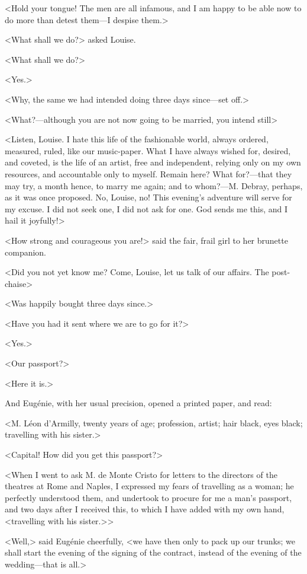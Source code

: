  <Hold your tongue! The men are all infamous, and I am happy to be able now to do more than detest them—I despise them.> 

 <What shall we do?> asked Louise. 

 <What shall we do?> 

 <Yes.> 

 <Why, the same we had intended doing three days since—set off.> 

 <What?—although you are not now going to be married, you intend still\longdash> 

 <Listen, Louise. I hate this life of the fashionable world, always ordered, measured, ruled, like our music-paper. What I have always wished for, desired, and coveted, is the life of an artist, free and independent, relying only on my own resources, and accountable only to myself. Remain here? What for?—that they may try, a month hence, to marry me again; and to whom?—M. Debray, perhaps, as it was once proposed. No, Louise, no! This evening's adventure will serve for my excuse. I did not seek one, I did not ask for one. God sends me this, and I hail it joyfully!> 

 <How strong and courageous you are!> said the fair, frail girl to her brunette companion. 

 <Did you not yet know me? Come, Louise, let us talk of our affairs. The post-chaise\longdash> 

 <Was happily bought three days since.> 

 <Have you had it sent where we are to go for it?> 

 <Yes.> 

 <Our passport?> 

 <Here it is.> 

 And Eugénie, with her usual precision, opened a printed paper, and read: 

 <M. Léon d'Armilly, twenty years of age; profession, artist; hair black, eyes black; travelling with his sister.> 

 <Capital! How did you get this passport?> 

 <When I went to ask M. de Monte Cristo for letters to the directors of the theatres at Rome and Naples, I expressed my fears of travelling as a woman; he perfectly understood them, and undertook to procure for me a man's passport, and two days after I received this, to which I have added with my own hand, <travelling with his sister.>>

<Well,> said Eugénie cheerfully, <we have then only to pack up our trunks; we shall start the evening of the signing of the contract, instead of the evening of the wedding—that is all.> 

